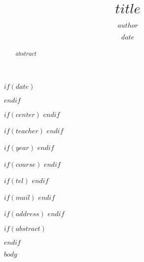 \documentclass[$if(classoptions)$$classoptions$$endif$]{ifirak}
\begin{document}
\title{$title$}
\author{$author$}

$if(date)$
\date{$date$}
$endif$

$if(center)$
$endif$

$if(teacher)$
$endif$

$if(year)$
$endif$

$if(course)$
$endif$

$if(tel)$
$endif$

$if(mail)$
$endif$

$if(address)$
$endif$

\maketitle
$if(abstract)$
\begin{abstract}
$abstract$
\end{abstract}
$endif$


$body$
\end{document}
